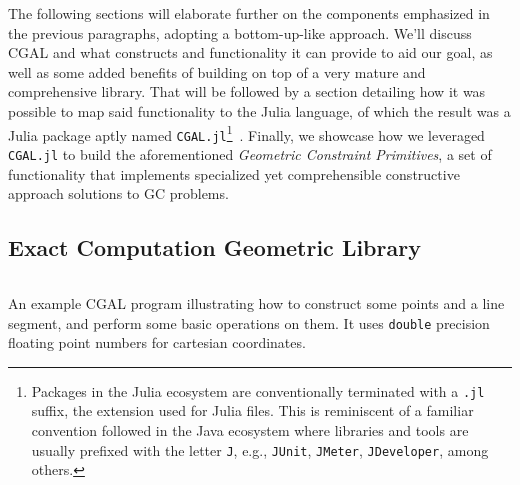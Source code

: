 The following sections will elaborate further on the components emphasized in
the previous paragraphs, adopting a bottom-up-like approach.  We'll discuss
\ac{CGAL} and what constructs and functionality it can provide to aid our goal,
as well as some added benefits of building on top of a very mature and
comprehensive library.  That will be followed by a section detailing how it was
possible to map said functionality to the Julia language, of which the result
was a Julia package aptly named \texttt{CGAL.jl}\footnote{Packages in the Julia
ecosystem are conventionally terminated with a \texttt{.jl} suffix, the
extension used for Julia files.  This is reminiscent of a familiar convention
followed in the Java ecosystem where libraries and tools are usually prefixed
with the letter \texttt{J}, e.g., \texttt{JUnit}, \texttt{JMeter},
\texttt{JDeveloper}, among others.}~\cite{Ventura:2019:CGAL.jl}.  Finally, we
showcase how we leveraged \texttt{CGAL.jl} to build the aforementioned
\textit{Geometric Constraint Primitives}, a set of functionality that implements
specialized yet comprehensible constructive approach solutions to \ac{GC}
problems.

\subsection{Exact Computation Geometric Library}%
\label{sec:solution.impl.cgal}

\begin{listing}[htb]
  \inputminted{cpp}{cpp/points_and_segments.cpp}
  \caption[CGAL: Three points and one segment]{
    An example CGAL program illustrating how to construct some points and a line
    segment, and perform some basic operations on them.  It uses \texttt{double}
    precision floating point numbers for cartesian coordinates.}%
  \label{lst:solution.impl.cgal.pas}
\end{listing}

